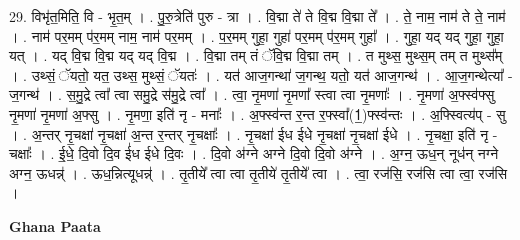 \documentclass[17pt]{extarticle}
\begin{document}
29. विभृ॑त॒मिति॒ वि - भृ॒त॒म् । . पु॒रु॒त्रेति॑ पुरु - त्रा । . वि॒द्मा ते॑ ते वि॒द्म वि॒द्मा ते᳚ । . ते॒ नाम॒ नाम॑ ते ते॒ नाम॑ । . नाम॑ पर॒मम् प॑र॒मम् नाम॒ नाम॑ पर॒मम् । . प॒र॒मम् गुहा॒ गुहा॑ पर॒मम् प॑र॒मम् गुहा᳚ । . गुहा॒ यद् यद् गुहा॒ गुहा॒ यत् । . यद् वि॒द्म वि॒द्म यद् यद् वि॒द्म । . वि॒द्मा तम् तं ॅवि॒द्म वि॒द्मा तम् । . त मुथ्स॒ मुथ्स॒म् तम् त मुथ्स᳚म् । . उथ्सं॒ ॅयतो॒ यत॒ उथ्स॒ मुथ्सं॒ ॅयतः॑ । . यत॑ आज॒गन्था॑ ज॒गन्थ॒ यतो॒ यत॑ आज॒गन्थ॑ । . आ॒ज॒गन्थेत्या᳚ - ज॒गन्थ॑ । . स॒मु॒द्रे त्वा᳚ त्वा समु॒द्रे स॑मु॒द्रे त्वा᳚ । . त्वा॒ नृ॒मणा॑ नृ॒मणा᳚ स्त्वा त्वा नृ॒मणाः᳚ । . नृ॒मणा॑ अ॒फ्स्व॑फ्सु नृ॒मणा॑ नृ॒मणा॑ अ॒फ्सु । . नृ॒मणा॒ इति॑ नृ - मनाः᳚ । . अ॒फ्स्व॑न्त र॒न्त र॒फ्स्वा᳚(1॒)फ्स्व॑न्तः । . अ॒फ्स्वित्य॑प् - सु । . अ॒न्तर् नृ॒चक्षा॑ नृ॒चक्षा॑ अ॒न्त र॒न्तर् नृ॒चक्षाः᳚ । . नृ॒चक्षा॑ ईध ईधे नृ॒चक्षा॑ नृ॒चक्षा॑ ईधे । . नृ॒चक्षा॒ इति॑ नृ - चक्षाः᳚ । . ई॒धे॒ दि॒वो दि॒व ई॑ध ईधे दि॒वः । . दि॒वो अ॑ग्ने अग्ने दि॒वो दि॒वो अ॑ग्ने । . अ॒ग्न॒ ऊध॒न् नूध॑न् नग्ने अग्न॒ ऊधन्न्॑ । . ऊध॒न्नित्यूधन्न्॑ । . तृ॒तीये᳚ त्वा त्वा तृ॒तीये॑ तृ॒तीये᳚ त्वा । . त्वा॒ रज॑सि॒ रज॑सि त्वा त्वा॒ रज॑सि । \newline

\textbf{Ghana Paata } \newline
\end{document}
